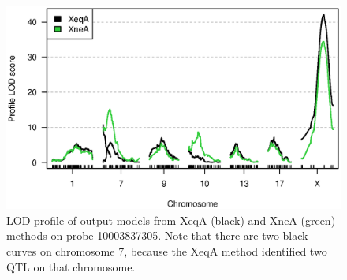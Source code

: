 \documentclass[12pt,letterpaper]{article}
\begin{document}
\clearpage
\begin{figure}
\centering
\includegraphics[width=\textwidth]{Figs/fig_prob305.eps}

\vspace{0cm}

\caption{LOD profile of output models from XeqA (black) and XneA
  (green) methods on probe 10003837305. Note that there are two black
  curves on chromosome 7, because the XeqA method identified two QTL
  on that chromosome.
\label{fig:probe305}}
\end{figure}
\end{document}
